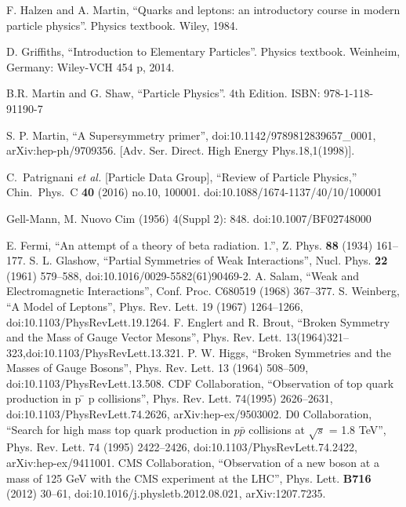 
\begin{thebibliography}{9}

  F. Halzen and A. Martin,
  ``Quarks and leptons: an introductory course in modern particle physics''. Physics textbook.
  Wiley, 1984.
  
  D. Griffiths,
  ``Introduction to Elementary Particles''. Physics textbook. 
  Weinheim, Germany: Wiley-VCH 454 p, 2014.

  B.R. Martin and G. Shaw,
  ``Particle Physics''. 4th Edition.
   ISBN: 978-1-118-91190-7

S. P. Martin, 
“A Supersymmetry primer”, 
doi:10.1142/9789812839657\_0001,
arXiv:hep-ph/9709356. [Adv. Ser. Direct. High Energy Phys.18,1(1998)].


  C.~Patrignani {\it et al.} [Particle Data Group],
  ``Review of Particle Physics,''
  Chin.\ Phys.\ C {\bf 40} (2016) no.10,  100001.
  doi:10.1088/1674-1137/40/10/100001

  Gell-Mann, 
  M. Nuovo Cim (1956) 4(Suppl 2): 848. 
  doi:10.1007/BF02748000

  E. Fermi, 
  ``An attempt of a theory of beta radiation. 1.'', 
  Z. Phys. \textbf{88} (1934) 161–177.
 S. L. Glashow,
  “Partial Symmetries of Weak Interactions”, 
  Nucl. Phys. \textbf{22} (1961) 579–588, 
  doi:10.1016/0029-5582(61)90469-2.
A. Salam, 
“Weak and Electromagnetic Interactions”, 
Conf. Proc. C680519 (1968) 367–377.
   S. Weinberg, 
  “A Model of Leptons”,
   Phys. Rev. Lett. 19 (1967) 1264–1266, 
   doi:10.1103/PhysRevLett.19.1264.
F. Englert and R. Brout, 
“Broken Symmetry and the Mass of Gauge Vector Mesons”, 
Phys. Rev. Lett. 13(1964)321–323,doi:10.1103/PhysRevLett.13.321.
 P. W. Higgs,
  “Broken Symmetries and the Masses of Gauge Bosons”, 
  Phys. Rev. Lett. 13 (1964)
508–509, doi:10.1103/PhysRevLett.13.508.
CDF Collaboration, 
“Observation of top quark production in p ̄ p collisions”, 
Phys. Rev. Lett. 74(1995) 2626–2631, 
doi:10.1103/PhysRevLett.74.2626, arXiv:hep-ex/9503002.
 D0 Collaboration, 
 “Search for high mass top quark production in $p\bar{p}$  collisions at $\sqrt{s}$ = 1.8 TeV”, 
 Phys. Rev. Lett. 74 (1995) 2422–2426, 
 doi:10.1103/PhysRevLett.74.2422, arXiv:hep-ex/9411001.
 CMS Collaboration, 
 “Observation of a new boson at a mass of 125 GeV with the CMS experiment at the LHC”, 
 Phys. Lett. {\bf B716} (2012) 30–61, 
 doi:10.1016/j.physletb.2012.08.021, arXiv:1207.7235.
 

\end{thebibliography}
